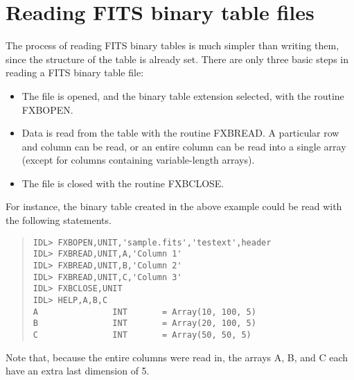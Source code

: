 \section{Reading FITS binary table files}

The process of reading FITS binary tables is much simpler than writing them,
since the structure of the table is already set.  There are only three basic
steps in reading a FITS binary table file:
%
\begin{itemize}
\item
	The file is opened, and the binary table extension selected, with the
	routine FXBOPEN.
\item
	Data is read from the table with the routine FXBREAD.  A particular row
	and column can be read, or an entire column can be read into a single
	array (except for columns containing variable-length arrays).
\item
	The file is closed with the routine FXBCLOSE.
\end{itemize}
%
For instance, the binary table created in the above example could be read with
the following statements.
%
\begin{quote}
\begin{verbatim}
IDL> FXBOPEN,UNIT,'sample.fits','testext',header
IDL> FXBREAD,UNIT,A,'Column 1'
IDL> FXBREAD,UNIT,B,'Column 2'
IDL> FXBREAD,UNIT,C,'Column 3'
IDL> FXBCLOSE,UNIT
IDL> HELP,A,B,C
A               INT       = Array(10, 100, 5)
B               INT       = Array(20, 100, 5)
C               INT       = Array(50, 50, 5)
\end{verbatim}
\end{quote}
%
Note that, because the entire columns were read in, the arrays A, B, and C each
have an extra last dimension of 5.


